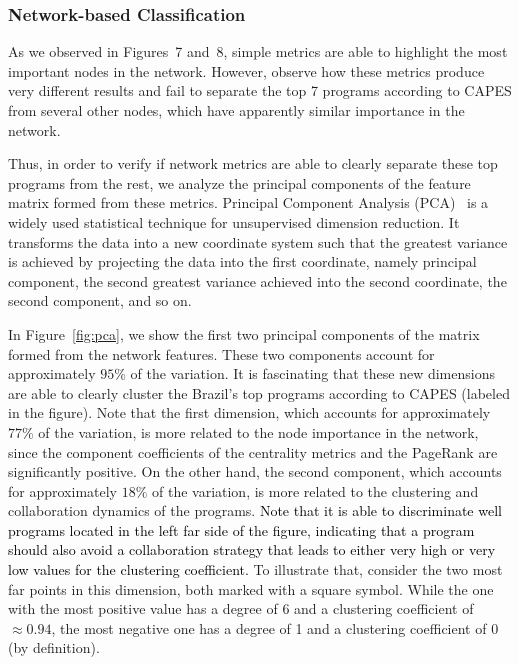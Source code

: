 \documentclass[10pt]{article}
\newcommand{\pedro}[1]{\textcolor{black}{#1}}
\begin{document}
\subsubsection*{Network-based Classification}
\label{sec:class}

As we observed in Figures~7 and~8, simple metrics are able to highlight the most important nodes in the network. However, observe how these metrics produce very different results and fail to separate the top 7 programs according to CAPES from several other nodes, which have apparently similar importance in the network. 

Thus, in order to verify if network metrics are able to clearly separate these top programs from the rest, we analyze the principal components of the feature matrix formed from
these metrics. Principal Component Analysis (PCA)~\cite{pca} is a widely used statistical
technique for unsupervised dimension reduction. It transforms the data into a new
coordinate system such that the greatest variance is achieved by projecting the data into
the first coordinate, namely principal component, the second greatest variance achieved
into the second coordinate, the second component, and so on. 

In Figure~\ref{fig:pca}, we show the first two principal components of the matrix formed
from the network features. These two components account for approximately $95\%$ of the
variation. It is fascinating that these new dimensions are able to clearly cluster the Brazil's
top programs according to CAPES (labeled in the figure).  Note that the first dimension,
which accounts for approximately $77\%$ of the variation, is more related to the node
importance in the network, since the component coefficients of the centrality metrics and
the PageRank are significantly positive. On the other hand, the second component, which
accounts for approximately $18\%$ of the variation, is more related to the clustering and
collaboration dynamics of the programs. \pedro{Note that it is able to discriminate well programs located in the left far side of the figure, indicating that a program should also avoid a collaboration strategy that leads to either very high or very low values for the clustering coefficient.} To illustrate that, consider the two most far
points in this dimension, both marked with a square symbol. While the one with the most
positive value has a degree of 6 and a clustering coefficient of $\approx 0.94$, the most
negative one has a degree of 1 and a clustering coefficient of $0$ (by definition).
\end{document}
